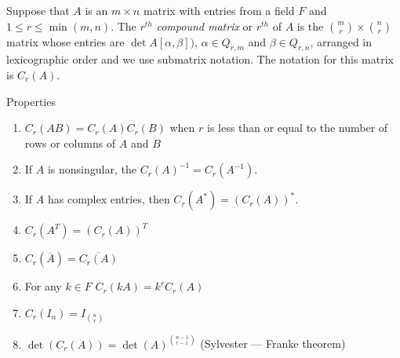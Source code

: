 \documentclass[12pt]{article}
\begin{document}
Suppose that $A$ is an $m \times n$  matrix with entries from a field $F$ and 
$1 \leq r \leq \min(m,n)$. The $r^{th}$ \emph{compound matrix} or
$r^{th}$ \emph{} of $A$ is the 
$\binom{m}{r} \times \binom{n}{r}$
matrix whose entries are $\det A[\alpha,\beta])$, 
$\alpha \in Q_{r,m}$ and $\beta \in Q_{r,n}$, arranged in lexicographic order  and we use submatrix notation.
The notation for this matrix is $C_r(A)$.


Properties

\begin{enumerate}
\item
$C_r(AB) = C_r(A)C_r(B)$ when $r$ is less than or equal to the number of rows or columns of $A$ and $B$
\item
If $A$ is nonsingular, the $C_r(A)^{-1} = C_r(A^{-1})$.
\item
If $A$ has complex entries, then $C_r(A^*) = (C_r(A))^*$.
\item
$C_r(A^T) = (C_r(A))^T$
\item
$C_r(\overline{A}) = \overline{C_r(A)}$
\item
For any $k \in F$ $C_r(kA) = k^r C_r(A)$
\item 
$C_r(I_n ) = I_{\binom{n}{r}}$
\item
$\det (C_r(A)) = \det (A)^{\binom{n-1}{r-1}}$ (Sylvester --- Franke theorem)
\end{enumerate}



\end{document}
